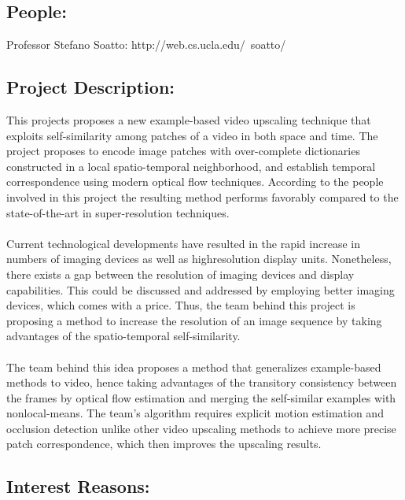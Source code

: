\documentclass{article}
\begin{document}
\subsection*{People:}

\begin{adjustwidth}{1cm}{}
	Professor Stefano Soatto:  http://web.cs.ucla.edu/~soatto/
\end{adjustwidth}

\subsection*{Project Description:}

\begin{adjustwidth}{1cm}{}
	This projects proposes a new example-based video upscaling technique that exploits self-similarity among patches of a video in both space and time. The project proposes to encode image patches with over-complete dictionaries constructed in a local spatio-temporal neighborhood, and establish temporal correspondence using modern optical flow techniques. According to the people involved in this project the resulting method performs favorably compared to the state-of-the-art in super-resolution techniques. \\\\
	Current technological developments have resulted in the rapid increase in numbers of imaging devices as well as highresolution display units. Nonetheless, there exists a gap between the resolution of imaging devices and display capabilities. This could be discussed and addressed by employing better imaging devices, which comes with a price. Thus, the team behind this project is  proposing a method to increase the resolution of an image sequence by taking advantages of  the spatio-temporal self-similarity. \\\\
	The team behind this idea proposes a method that generalizes example-based methods to video, hence taking advantages of  the transitory consistency between the frames by optical flow estimation and merging the self-similar examples with nonlocal-means. The team's algorithm requires explicit motion estimation and occlusion detection unlike other video upscaling methods to achieve more precise patch correspondence, which then improves the upscaling results.
\end{adjustwidth}

\subsection*{Interest Reasons:}
\end{document}
